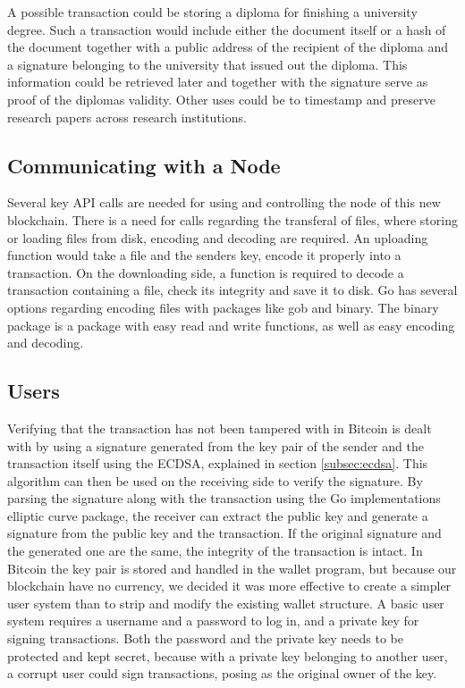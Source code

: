 \documentclass[12pt]{article}
\begin{document}

A possible transaction could be storing a diploma for finishing a university degree. Such a transaction would include either the document itself or a hash of the document together with a public address of the recipient of the diploma and a signature belonging to the university that issued out the diploma. This information could be retrieved later and together with the signature serve as proof of the diplomas validity. Other uses could be to timestamp and preserve research papers across research institutions. 

\subsection{Communicating with a Node}
 
Several key API calls are needed for using and controlling the node of this new blockchain. There is a need for calls regarding the transferal of files, where storing or loading files from disk, encoding and decoding are required. An uploading function would take a file and the senders key, encode it properly into a transaction. On the downloading side, a function is required to decode a transaction containing a file, check its integrity and save it to disk. Go has several options regarding encoding files with  packages like gob and binary. The binary package is a package with easy read and write functions, as well as easy encoding and decoding. %

\subsection{Users}

Verifying that the transaction has not been tampered with in Bitcoin is dealt with by using a signature generated from the key pair of the sender and the transaction itself using the ECDSA, explained in section \ref{subsec:ecdsa}. This algorithm can then be used on the receiving side to verify the signature. By parsing the signature along with the transaction using the Go implementations elliptic curve package, the receiver can extract the public key and generate a signature from the public key and the transaction. If the original signature and the generated one are the same, the integrity of the transaction is intact. In Bitcoin the key pair is stored and handled in the wallet program, but because our blockchain have no currency, we decided it was more effective to create a simpler user system than to strip and modify the existing wallet structure. A basic user system requires a username and a password to log in, and a private key for signing transactions. Both the password and the private key needs to be protected and kept secret, because with a private key belonging to another user, a corrupt user could sign transactions, posing as the original owner of the key. 
\end{document}
